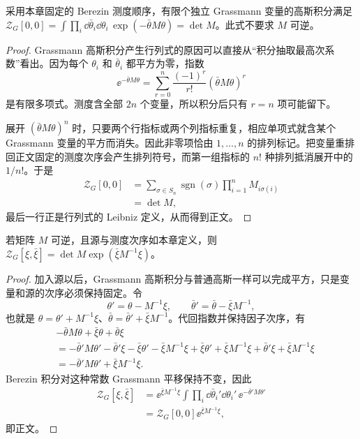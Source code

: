\begin{lemma}
采用本章固定的 Berezin 测度顺序，有限个独立 Grassmann 变量的高斯积分满足 $\mathcal Z_G[0,0]=\int\prod_i\dd\bar\theta_i\dd\theta_i\,\exp(-\bar\theta M\theta)=\det M$。此式不要求 $M$ 可逆。
\end{lemma}
\begin{proof}
Grassmann 高斯积分产生行列式的原因可以直接从“积分抽取最高次系数”看出。因为每个 $\theta_i$ 和 $\bar\theta_i$ 都平方为零，指数
\begin{equation*}
 \ee^{-\bar\theta M\theta}
 =\sum_{r=0}^{n}\frac{(-1)^r}{r!}(\bar\theta M\theta)^r
\end{equation*}
是有限多项式。测度含全部 $2n$ 个变量，所以积分后只有 $r=n$ 项可能留下。

展开 $(\bar\theta M\theta)^n$ 时，只要两个行指标或两个列指标重复，相应单项式就含某个 Grassmann 变量的平方而消失。因此非零项恰由 $1,\ldots,n$ 的排列标记。把变量重排回正文固定的测度次序会产生排列符号，而第一组指标的 $n!$ 种排列抵消展开中的 $1/n!$。于是
\begin{align*}
 \mathcal Z_G[0,0]
 &=\sum_{\sigma\in S_n}\operatorname{sgn}(\sigma)
 \prod_{i=1}^{n}M_{i\sigma(i)}\\
 &=\det M,
\end{align*}
最后一行正是行列式的 Leibniz 定义，从而得到正文。
\end{proof}

\begin{lemma}
若矩阵 $M$ 可逆，且源与测度次序如本章定义，则 $\mathcal Z_G[\xi,\bar\xi]=\det M\exp(\bar\xi M^{-1}\xi)$。
\end{lemma}
\begin{proof}
加入源以后，Grassmann 高斯积分与普通高斯一样可以完成平方，只是变量和源的次序必须保持固定。令
\begin{equation*}
 \theta'=\theta-M^{-1}\xi,
 \qquad
 \bar\theta'=\bar\theta-\bar\xi M^{-1},
\end{equation*}
也就是 $\theta=\theta'+M^{-1}\xi$、$\bar\theta=\bar\theta'+\bar\xi M^{-1}$。代回指数并保持因子次序，有
\begin{align*}
 &-\bar\theta M\theta+\bar\xi\theta+\bar\theta\xi\\
 &=-\bar\theta'M\theta'
 -\bar\theta'\xi-\bar\xi\theta'-\bar\xi M^{-1}\xi
 +\bar\xi\theta'+\bar\xi M^{-1}\xi
 +\bar\theta'\xi+\bar\xi M^{-1}\xi\\
 &=-\bar\theta'M\theta'+\bar\xi M^{-1}\xi.
\end{align*}
Berezin 积分对这种常数 Grassmann 平移保持不变，因此
\begin{align*}
 \mathcal Z_G[\xi,\bar\xi]
 &=\ee^{\bar\xi M^{-1}\xi}
 \int\prod_i\dd\bar\theta_i'\dd\theta_i'\,
 \ee^{-\bar\theta'M\theta'}\\
 &=\mathcal Z_G[0,0]\ee^{\bar\xi M^{-1}\xi},
\end{align*}
即正文。
\end{proof}

